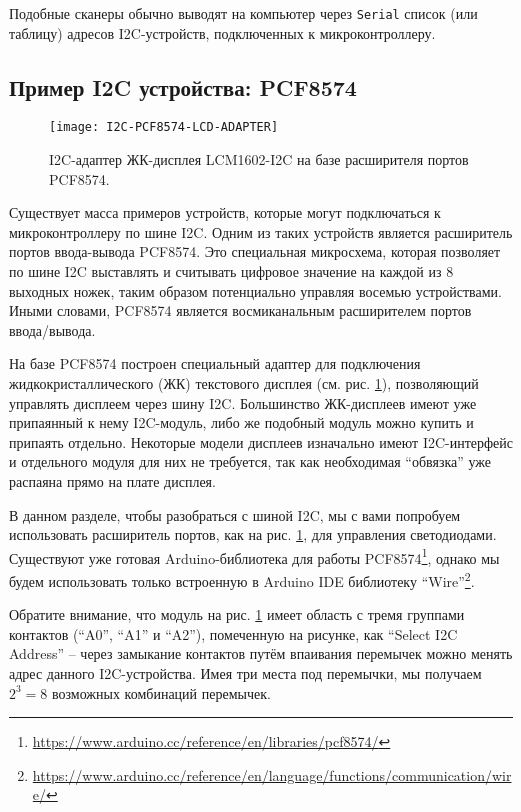 \documentclass[../sparc.tex]{subfiles}
\begin{document}
Подобные сканеры обычно выводят на компьютер через \texttt{Serial} список (или
таблицу) адресов I2C-устройств, подключенных к микроконтроллеру.

\subsection{Пример I2C устройства: PCF8574}

\begin{figure}[H]
  \centering
  \texttt{[image: I2C-PCF8574-LCD-ADAPTER]}
  \caption{I2C-адаптер ЖК-дисплея LCM1602-I2C на базе расширителя портов
    PCF8574.}
  \label{fig:i2c-pcf8574-lcd-adapter}
\end{figure}

Существует масса примеров устройств, которые могут подключаться к
микроконтроллеру по шине \gls{I2C}.  Одним из таких устройств является
расширитель портов ввода-вывода PCF8574.  Это специальная микросхема, которая
позволяет по шине I2C выставлять и считывать цифровое значение на каждой из 8
выходных ножек, таким образом потенциально управляя восемью устройствами.  Иными
словами, PCF8574 является восмиканальным расширителем портов ввода/вывода.

На базе PCF8574 построен специальный адаптер для подключения
жидкокристаллического (ЖК) текстового дисплея
(см. рис. \ref{fig:i2c-pcf8574-lcd-adapter}), позволяющий управлять дисплеем
через шину I2C.  Большинство ЖК-дисплеев имеют уже припаянный к нему I2C-модуль,
либо же подобный модуль можно купить и припаять отдельно.  Некоторые модели
дисплеев изначально имеют I2C-интерфейс и отдельного модуля для них не
требуется, так как необходимая ``обвязка'' уже распаяна прямо на плате дисплея.

В данном разделе, чтобы разобраться с шиной I2C, мы с вами попробуем
использовать расширитель портов, как на рис. \ref{fig:i2c-pcf8574-lcd-adapter},
для управления светодиодами.  Существуют уже готовая Arduino-библиотека для
работы
PCF8574\footnote{\url{https://www.arduino.cc/reference/en/libraries/pcf8574/}},
однако мы будем использовать только встроенную в Arduino IDE библиотеку
``Wire''\footnote{\url{https://www.arduino.cc/reference/en/language/functions/communication/wire/}}.

Обратите внимание, что модуль на рис. \ref{fig:i2c-pcf8574-lcd-adapter} имеет
область с тремя группами контактов (``A0'', ``A1'' и ``A2''), помеченную на
рисунке, как ``Select I2C Address'' -- через замыкание контактов путём впаивания
перемычек можно менять адрес данного I2C-устройства.  Имея три места под
перемычки, мы получаем $2^3 = 8$ возможных комбинаций перемычек.
\end{document}
